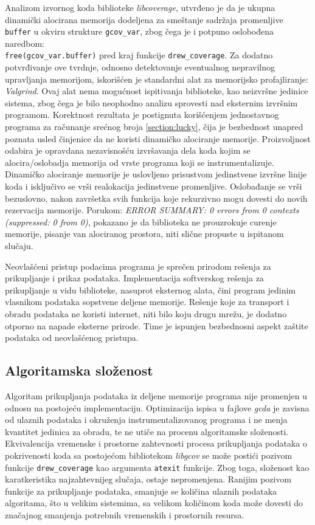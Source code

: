 \documentclass[12pt,oneside]{memoir}
\newcommand{\kod}[1]{\texttt{#1}}
\newcommand{\strano}[1]{\textit{#1}}
\begin{document}
Analizom izvornog koda biblioteke \strano{libcoverage}, utvrđeno je da je ukupna dinamički alocirana memorija dodeljena za smeštanje sadržaja promenljive \kod{buffer} u okviru strukture \kod{gcov\_var}, zbog čega je i potpuno oslobođena  naredbom:\\
\kod{free(gcov\_var.buffer)} pred kraj funkcije  \kod{drew\_coverage}. Za dodatno potvrđivanje ove tvrdnje, odnosno detektovanje eventualnog nepravilnog upravljanja memorijom, iskorišćen je standardni alat za memorijsko profajliranje: \strano{Valgrind}. Ovaj alat nema mogućnost ispitivanja biblioteke, kao neizvršne jedinice sistema, zbog čega je bilo neophodno analizu sprovesti nad eksternim izvršnim programom. Korektnost rezultata je postignuta korišćenjem jednostavnog programa za računanje srećnog broja \ref{section:lucky}, čija je bezbednost unapred poznata usled činjenice da ne koristi dinamičko alociranje memorije. Proizvoljnost odabira je opravdana nezavisnošću izvršavanja dela koda kojim se alocira/oslobadja memorija od vrste programa koji se instrumentalizuje. Dinamičko alociranje memorije je uslovljeno prisustvom jedinstvene izvršne linije koda i isključivo se vrši realokacija jedinstvene promenljive. Oslobađanje se vrši bezuslovno, nakon završetka svih funkcija koje rekurzivno mogu dovesti do novih rezervacija memorije. Porukom: \strano{ERROR SUMMARY: 0 errors from 0 contexts (suppressed: 0 from 0)}, pokazano je da biblioteka ne prouzrokuje curenje memorije, pisanje van alociranog prostora, niti slične propuste u ispitanom slučaju. 

Neovlašćeni pristup podacima programa je sprečen prirodom rešenja za prikupljanje i prikaz podataka. Implementacija softverskog rešenja za prikupljanje u vidu biblioteke, nasuprot eksternog alata, čini program jedinim vlasnikom podataka sopstvene deljene memorije. Rešenje koje za transport i obradu podataka ne koristi internet, niti bilo koju drugu mrežu, je dodatno otporno na napade eksterne prirode. Time je ispunjen bezbednosni aspekt zaštite podataka od neovlašćenog pristupa. 

\subsection{Algoritamska složenost}

Algoritam prikupljanja podataka iz deljene memorije programa nije promenjen u odnosu na postojeću implementaciju. Optimizacija ispisa u fajlove \strano{gcda} je zavisna od ulaznih podataka i okruženja instrumentalizovanog programa i ne menja kvantitet jedinica za obradu, te ne utiče na procenu algoritamske složenosti. Ekvivalencija vremenske i prostorne zahtevnosti procesa prikupljanja podataka o pokrivenosti koda sa postojećom bibliotekom \strano{libgcov} se može postići pozivom funkcije \kod{drew\_coverage} kao argumenta \kod{atexit} funkcije. Zbog toga, složenost kao karatkeristika najzahtevnijeg slučaja, ostaje nepromenjena. Ranijim pozivom funkcije za prikupljanje podataka, smanjuje se količina ulaznih podataka algoritama, što u velikim sistemima, sa velikom količinom koda može dovesti do značajnog smanjenja potrebnih vremenskih i prostornih resursa. 
\end{document}
